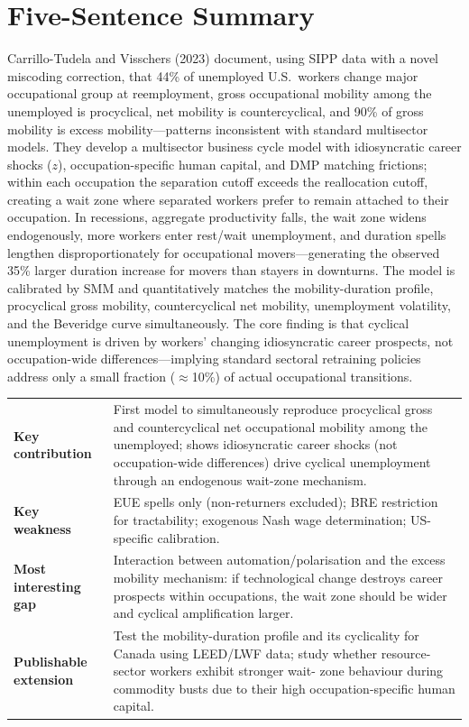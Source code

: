 \section*{Five-Sentence Summary}

Carrillo-Tudela and Visschers (2023) document, using SIPP data with a novel
miscoding correction, that 44\% of unemployed U.S.\ workers change major
occupational group at reemployment, gross occupational mobility among the
unemployed is procyclical, net mobility is countercyclical, and 90\% of gross
mobility is excess mobility---patterns inconsistent with standard multisector
models. They develop a multisector business cycle model with idiosyncratic
career shocks ($z$), occupation-specific human capital, and DMP matching
frictions; within each occupation the separation cutoff exceeds the reallocation
cutoff, creating a wait zone where separated workers prefer to remain attached
to their occupation. In recessions, aggregate productivity falls, the wait zone
widens endogenously, more workers enter rest/wait unemployment, and duration
spells lengthen disproportionately for occupational movers---generating the
observed 35\% larger duration increase for movers than stayers in downturns.
The model is calibrated by SMM and quantitatively matches the mobility-duration
profile, procyclical gross mobility, countercyclical net mobility, unemployment
volatility, and the Beveridge curve simultaneously. The core finding is that
cyclical unemployment is driven by workers' changing idiosyncratic career
prospects, not occupation-wide differences---implying standard sectoral
retraining policies address only a small fraction ($\approx$10\%) of actual
occupational transitions.

\vspace{6pt}
\begin{quickref}
\begin{tabularx}{\linewidth}{@{}lX@{}}
\textbf{Key contribution} &
  First model to simultaneously reproduce procyclical gross and countercyclical
  net occupational mobility among the unemployed; shows idiosyncratic career
  shocks (not occupation-wide differences) drive cyclical unemployment through
  an endogenous wait-zone mechanism. \\[4pt]
\textbf{Key weakness} &
  EUE spells only (non-returners excluded); BRE restriction for tractability;
  exogenous Nash wage determination; US-specific calibration. \\[4pt]
\textbf{Most interesting gap} &
  Interaction between automation/polarisation and the excess mobility
  mechanism: if technological change destroys career prospects within
  occupations, the wait zone should be wider and cyclical amplification larger.
  \\[4pt]
\textbf{Publishable extension} &
  Test the mobility-duration profile and its cyclicality for Canada using
  LEED/LWF data; study whether resource-sector workers exhibit stronger wait-
  zone behaviour during commodity busts due to their high occupation-specific
  human capital.
\end{tabularx}
\end{quickref}
